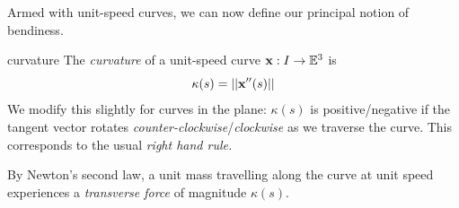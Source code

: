 \begin{examples}{}{}
\begin{enumerate}
	\end{enumerate}
\end{examples}


\medskip


Armed with unit-speed curves, we can now define our principal notion of bendiness.

\begin{defn}{}{curvature}
	The \emph{curvature} of a unit-speed curve ${\mathbf{x}}:I\to\mathbb{E}^3$ is 
	\[
		\kappa(s)=\left| \left| {\mathbf{x}}''(s)\right|\right|
	\]
	We modify this slightly for curves in the plane: $\kappa(s)$ is positive/negative if the tangent vector rotates \emph{counter-clockwise}/\emph{clockwise} as we traverse the curve. This corresponds to the usual \emph{right hand rule.}
\end{defn}

By Newton's second law, a unit mass travelling along the curve at unit speed experiences a \emph{transverse force} of magnitude $\kappa(s)$.

